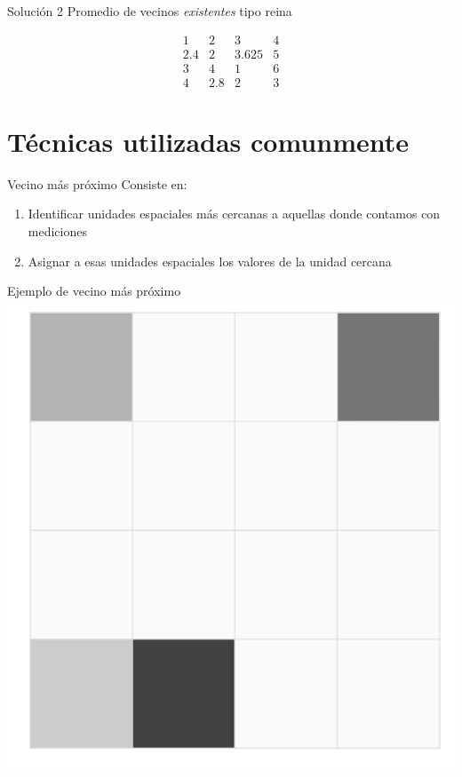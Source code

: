 \documentclass[
  11pt,
  ignorenonframetext,
]{beamer}
\providecommand{\tightlist}{%
  \setlength{\itemsep}{0pt}\setlength{\parskip}{0pt}}
\begin{document}
\begin{frame}{Solución 2}
\protect\hypertarget{soluciuxf3n-2}{}
Promedio de vecinos \emph{existentes} tipo reina

\[\begin{matrix}
1 & 2 & 3 & 4 \\
2.4 & 2 & 3.625 & 5 \\
3 & 4 & 1 & 6 \\
4 & 2.8 & 2 & 3
\end{matrix}\]
\end{frame}

\hypertarget{tuxe9cnicas-utilizadas-comunmente}{%
\section{Técnicas utilizadas
comunmente}\label{tuxe9cnicas-utilizadas-comunmente}}

\begin{frame}{Vecino más próximo}
\protect\hypertarget{vecino-muxe1s-pruxf3ximo}{}
Consiste en:

\begin{enumerate}
\tightlist
\item
  Identificar unidades espaciales más cercanas a aquellas donde contamos
  con mediciones
\item
  Asignar a esas unidades espaciales los valores de la unidad cercana
\end{enumerate}
\end{frame}

\begin{frame}{Ejemplo de vecino más próximo}
\protect\hypertarget{ejemplo-de-vecino-muxe1s-pruxf3ximo}{}
\includegraphics{Interpolacion/Ejemplo-vecino-0.png}
\end{frame}
\end{document}
